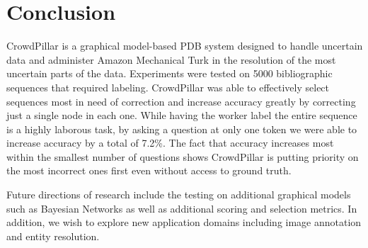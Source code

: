 \section{Conclusion}
CrowdPillar is a graphical model-based PDB system designed to handle uncertain data and administer Amazon Mechanical Turk in the resolution of the most uncertain parts of the data.  Experiments were tested on 5000 bibliographic sequences that required labeling.  CrowdPillar was able to effectively select sequences most in need of correction and increase accuracy greatly by correcting just a single node in each one.  While having the worker label the entire sequence is a highly laborous task, by asking a question at only one token we were able to increase accuracy by a total of 7.2\%.  The fact that accuracy increases most within the smallest number of questions shows CrowdPillar is putting priority on the most incorrect ones first even without access to ground truth.

Future directions of research include the testing on additional graphical models such as Bayesian Networks as well as additional scoring and selection metrics.  In addition, we wish to explore new application domains including image annotation and entity resolution.
